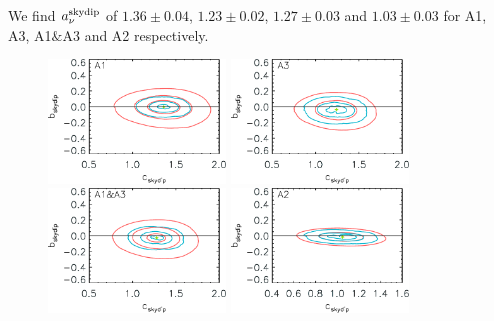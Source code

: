 We find $a_\nu^{\rm{skydip}}$ of
$1.36 \pm 0.04$,
$1.23 \pm 0.02$,
$1.27 \pm 0.03$ and
$1.03 \pm 0.03$ for A1, A3, A1$\&$A3 and A2 respectively.


\begin{figure}[ht!]
  \begin{center}
    \includegraphics[clip=true, trim={0, -0.3cm, -0.3cm, 0}, width=0.42\textwidth]{Figures/Opacity/fit_nika2_tau_from_skydip_mwc349_a1.pdf}
    \includegraphics[clip=true, trim={0, -0.3cm, -0.3cm, 0}, width=0.42\textwidth]{Figures/Opacity/fit_nika2_tau_from_skydip_mwc349_a3.pdf}
    \includegraphics[clip=true, trim={0, -0.3cm, -0.3cm, 0}, width=0.42\textwidth]{Figures/Opacity/fit_nika2_tau_from_skydip_mwc349_1mm.pdf}
    \includegraphics[clip=true, trim={0, -0.3cm, -0.3cm, 0}, width=0.42\textwidth]{Figures/Opacity/fit_nika2_tau_from_skydip_mwc349_a2.pdf}

\end{center}
\end{figure}
